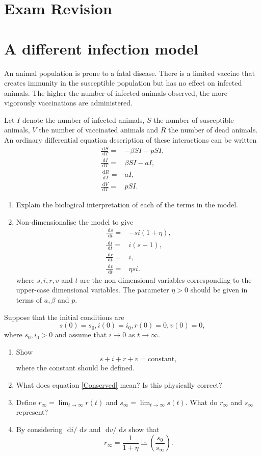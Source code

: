 \documentclass[10pt]{article}
\newcommand{\bb}{\begin{equation}}
\newcommand{\ee}{\end{equation}}
\newcommand{\rd}{\text{ d}}
\newcommand{\eqn}[1]{equation \eqref{#1}}
\renewcommand{\l}{\left(}
\renewcommand{\r}{\right)}
\newcounter{Counter1}
\begin{document}
\section*{Exam Revision}
\section{A different infection model}
An animal population is prone to a fatal disease. There is a limited vaccine that creates immunity in the susceptible population but has no effect on infected animals. The higher the number of infected animals observed, the more vigorously vaccinations are administered.

Let $I$ denote the number of infected animals, $S$ the number of susceptible animals, $V$ the number of vaccinated animals and $R$ the number of dead animals. An ordinary differential equation description of these interactions can be written
\begin{align}
\frac{\rd S}{\rd T} =&-\beta SI-pSI,\\
\frac{\rd I}{\rd T} =&\beta SI-aI,\\
\frac{\rd R}{\rd T} =&aI,\\
\frac{\rd V}{\rd T} =&pSI.
\end{align}

\begin{enumerate}

\item Explain the biological interpretation of each of the terms in the model.

\item Non-dimensionalise the model to give
\begin{align}
\frac{\rd s}{\rd t} =&-si(1+\eta),\label{Nondims1}\\
\frac{\rd i}{\rd t} =&i(s-1),\\
\frac{\rd r}{\rd t} =&i,\\
\frac{\rd v}{\rd t} =&\eta si.\label{Nondimv1}
\end{align}
where $s, i, r, v$ and $t$ are the non-dimensional variables corresponding  to the upper-case dimensional variables. The parameter $\eta>0$ should be given in terms of $a, \beta$ and $p$.
\setcounter{Counter1}{\value{enumi}}
\end{enumerate}

Suppose that the initial conditions are
\bb
s(0)=s_0, i(0)=i_0, r(0)=0, v(0)=0,\nonumber
\ee
where $s_0, i_0>0$ and assume that $i\rightarrow 0$ as $t\rightarrow\infty$.


\begin{enumerate}
\setcounter{enumi}{\value{Counter1}}
\item Show 
\bb
s+i+r+v=\textrm{constant},\label{Conserved}
\ee
where the constant should be defined.
\item What does \eqn{Conserved} mean? Is this physically correct?
\item Define $r_\infty=\lim_{t\rightarrow\infty}r(t)$ and $s_\infty=\lim_{t\rightarrow\infty}s(t)$. What do $r_\infty$ and $s_\infty$ represent?
\item By considering $\rd i/\rd s$ and $\rd v/\rd s$ show that
\bb
r_\infty=\frac{1}{1+\eta}\ln\l\frac{s_0}{s_\infty}\r.
\ee
\end{enumerate}
\end{document}
